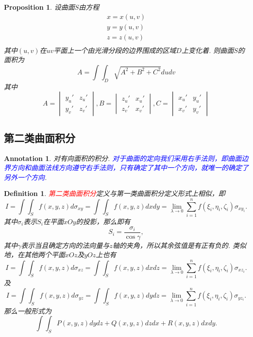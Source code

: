 \documentclass{article}
\newtheorem{proposition}[theorem]{Proposition}
\newtheorem{definition}[theorem]{Definition}
\newtheorem{annotation}[theorem]{Annotation}
\newcommand{\redt}[1]{\textcolor{red}{#1}}
\newcommand{\bluet}[1]{\textcolor{blue}{#1}}
\begin{document}
\begin{proposition}
\rm 设曲面$S$由方程
$$
\begin{array}{ll}
x = x(u,v) \\
y = y(u,v) \\
z = z(u,v) \\
\end{array}
$$
其中$(u,v)$在$uv$平面上一个由光滑分段的边界围成的区域$D$上变化着. 则曲面$S$的面积为
$$
A = \int\int_D \sqrt{A^2 + B^2 + C^2}dudv
$$
其中
$$
A = \begin{vmatrix}
y_u' & z_u' \\
y_v' & z_v'
\end{vmatrix},
B = \begin{vmatrix}
z_u' & x_u' \\
z_v' & x_v'
\end{vmatrix},
C = \begin{vmatrix}
x_u' & y_u' \\
x_v' & y_v'
\end{vmatrix}
$$
\end{proposition}

\subsection{第二类曲面积分}

\begin{annotation}
\rm 对有向面积的积分. \bluet{对于曲面的定向我们采用右手法则，即曲面边界方向和曲面法线方向遵守右手法则，只有确定了其中一个方向，就唯一的确定了另外一个方向}.
\end{annotation}

\begin{definition}
\rm \redt{第二类曲面积分}定义与第一类曲面积分定义形式上相似，即
$$
I = \int\int_{S} f(x,y,z)d\sigma_{xy} =\int\int_{S} f(x,y,z)dxdy= \lim\limits_{\lambda \to 0}\sum\limits_{i=1}^n f(\xi_i,\eta_i,\zeta_i)\sigma_{xy_i}.
$$
其中$\sigma_i$表示$S_i$在平面$xOy$的投影，那么即有
$$
S_i = \frac{\sigma_i}{\cos \gamma},
$$
其中$\gamma$表示当且确定方向的法向量与$z$轴的夹角，所以其余弦值是有正有负的. 类似地，在其他两个平面$xOz$及$yOz$上也有
$$
I = \int\int_{S} f(x,y,z)d\sigma_{xz} =\int\int_{S} f(x,y,z)dxdz= \lim\limits_{\lambda \to 0}\sum\limits_{i=1}^n f(\xi_i,\eta_i,\zeta_i)\sigma_{xz_i}.
$$
及
$$
I = \int\int_{S} f(x,y,z)d\sigma_{yz} =\int\int_{S} f(x,y,z)dydz= \lim\limits_{\lambda \to 0}\sum\limits_{i=1}^n f(\xi_i,\eta_i,\zeta_i)\sigma_{yz_i}.
$$
那么一般形式为
$$
\int\int_{S} P(x,y,z)dydz + Q(x,y,z)dzdx + R(x,y,z)dxdy.  
$$
\end{definition}
\end{document}
